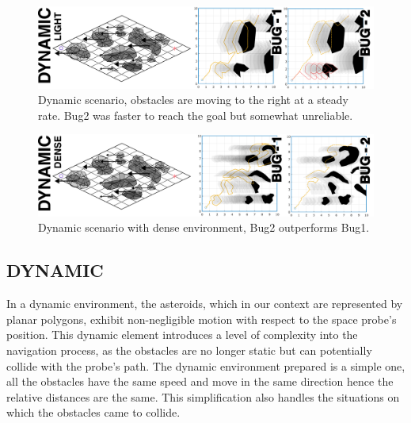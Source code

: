 \documentclass{IEEEtaes}
\begin{document}
\begin{figure}[t!]
    \begin{center}
        \includegraphics[width=1.0\linewidth]{figures/DYNAMIC-1.pdf}
     \end{center}
     \caption{Dynamic scenario, obstacles are moving to the right at a steady rate. Bug2 was faster to reach the goal but somewhat unreliable.}
     \label{dynamic-1}
\end{figure}

\begin{figure}[t!]
    \begin{center}
        \includegraphics[width=1.0\linewidth]{figures/DYNAMIC-2.pdf}
     \end{center}
     \caption{Dynamic scenario with dense environment, Bug2 outperforms Bug1.}
     \label{dynamic-2}
     \vspace{-1em}
\end{figure}

\subsection{\fontsize{10}{13}\selectfont DYNAMIC}

In a dynamic environment, the asteroids, which in our context are represented by planar polygons, exhibit non-negligible motion with respect to the space probe's position. This dynamic element introduces a level of complexity into the navigation process, as the obstacles are no longer static but can potentially collide with the probe's path. The dynamic environment prepared is a simple one, all the obstacles have the same speed and move in the same direction hence the relative distances are the same. This simplification also handles the situations on which the obstacles came to collide.
\end{document}
